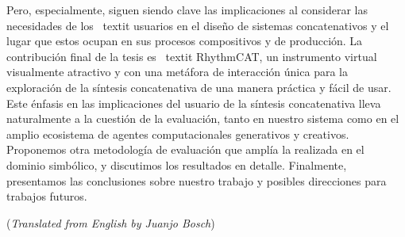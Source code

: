 Pero, especialmente, siguen siendo clave las implicaciones al considerar las necesidades de los \ textit {usuarios} en el diseño de sistemas concatenativos y el lugar que estos ocupan en sus procesos compositivos y de producción. La contribución final de la tesis es \ textit {RhythmCAT}, un instrumento virtual visualmente atractivo y con una metáfora de interacción única para la exploración de la síntesis concatenativa de una manera práctica y fácil de usar. Este énfasis en las implicaciones del usuario de la síntesis concatenativa lleva naturalmente a la cuestión de la evaluación, tanto en nuestro sistema como en el amplio ecosistema de agentes computacionales generativos y creativos. Proponemos otra metodología de evaluación que amplía la realizada en el dominio simbólico, y discutimos los resultados en detalle. Finalmente, presentamos las conclusiones sobre nuestro trabajo y posibles direcciones para trabajos futuros.

\vfill
{\small \noindent (\emph{Translated from English by Juanjo Bosch})}